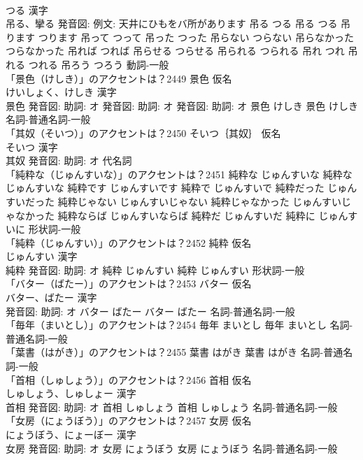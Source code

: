\documentclass[8pt]{extreport}
\begin{document}
\begin{CJK}{UTF8}{min}
\\	つる 漢字　
\\	吊る、攣る 発音図: 例文: 天井にひもをバ所があります	吊る つる		吊る つる 吊ります つります 吊って つって 吊った つった 吊らない つらない 吊らなかった つらなかった 吊れば つれば 吊らせる つらせる 吊られる つられる 吊れ つれ 吊れる つれる 吊ろう つろう				動詞-一般 
\\	「景色（けしき）」のアクセントは？2449	景色 仮名　
\\	けいしょく、けしき 漢字　
\\	景色 発音図: 助詞: オ 発音図: 助詞: オ 発音図: 助詞: オ	景色 けしき		景色 けしき				名詞-普通名詞-一般 
\\	「其奴（そいつ）」のアクセントは？2450	そいつ｛其奴｝ 仮名　
\\	そいつ 漢字　
\\	其奴 発音図: 助詞: オ							代名詞 
\\	「純粋な（じゅんすいな）」のアクセントは？2451		純粋な じゅんすいな		純粋な じゅんすいな 純粋です じゅんすいです 純粋で じゅんすいで 純粋だった じゅんすいだった 純粋じゃない じゅんすいじゃない 純粋じゃなかった じゅんすいじゃなかった 純粋ならば じゅんすいならば 純粋だ じゅんすいだ 純粋に じゅんすいに				形状詞-一般 
\\	「純粋（じゅんすい）」のアクセントは？2452	純粋 仮名　
\\	じゅんすい 漢字　
\\	純粋 発音図: 助詞: オ	純粋 じゅんすい		純粋 じゅんすい				形状詞-一般 
\\	「バター（ばたー）」のアクセントは？2453	バター 仮名　
\\	バター、ばたー 漢字　
\\	発音図: 助詞: オ	バター ばたー		バター ばたー				名詞-普通名詞-一般 
\\	「毎年（まいとし）」のアクセントは？2454		毎年 まいとし		毎年 まいとし				名詞-普通名詞-一般 
\\	「葉書（はがき）」のアクセントは？2455		葉書 はがき		葉書 はがき				名詞-普通名詞-一般 
\\	「首相（しゅしょう）」のアクセントは？2456	首相 仮名　
\\	しゅしょう、しゅしょー 漢字　
\\	首相 発音図: 助詞: オ	首相 しゅしょう		首相 しゅしょう				名詞-普通名詞-一般 
\\	「女房（にょうぼう）」のアクセントは？2457	女房 仮名　
\\	にょうぼう、にょーぼー 漢字　
\\	女房 発音図: 助詞: オ	女房 にょうぼう		女房 にょうぼう				名詞-普通名詞-一般 

\end{CJK}
\end{document}
